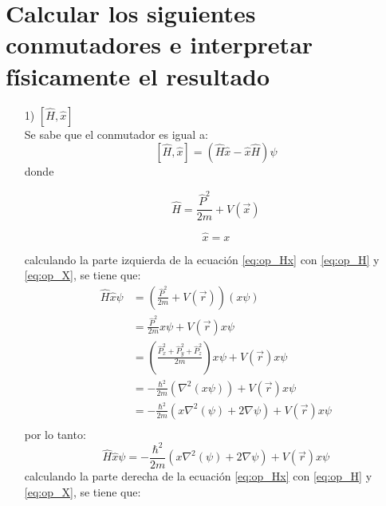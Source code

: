\documentclass[12pt,letterpaper]{article}
\begin{document}
\section*{Calcular los siguientes conmutadores e interpretar físicamente el resultado}
\begin{enumerate}
    \item[1)] $[\hat{H},\hat{x}]$\\
    Se sabe que el conmutador es igual a:
    \begin{equation}
        \label{eq:op_Hx}
        [\hat{H},\hat{x}]=(\hat{H}\hat{x}-\hat{x}\hat{H})\psi
    \end{equation}
    donde \\
    \begin{minipage}{0.5\linewidth}
        \begin{equation}
            \label{eq:op_H}
            \hat{H} = \frac{\hat{P}^2}{2m} +V(\vec{x})
        \end{equation}
    \end{minipage}
    \begin{minipage}{0.5\linewidth}
        \begin{equation}
            \label{eq:op_X}
            \hat{x} = x
        \end{equation}
    \end{minipage}
    calculando la parte izquierda de la ecuación \ref{eq:op_Hx} con \ref{eq:op_H} y \ref{eq:op_X}, se tiene que:
    \begin{align*}
        \hat{H}\hat{x}\psi &= \left(\frac{\hat{P}^2}{2m} +V(\vec{r}) \right) (x\psi)\\ 
        &= \frac{\hat{P}^2 }{2m} x\psi + V(\vec{r})x\psi \\
        &= \left(\frac{\hat{P}^2_x+\hat{P}^2_y+\hat{P}^2_z }{2m}\right) x\psi + V(\vec{r})x\psi \\
        &= -\frac{\hbar^2}{2m} \left(\nabla^2(x\psi)  \right)+ V(\vec{r})x\psi \\
        &= -\frac{\hbar^2}{2m} \left(x\nabla^2(\psi) + 2 \nabla \psi \right)+ V(\vec{r})x\psi \\
    \end{align*}
    por lo tanto:
    \begin{equation}
        \label{eq:Hx_izq}
        \hat{H}\hat{x}\psi =  -\frac{\hbar^2}{2m} \left(x\nabla^2(\psi) + 2 \nabla \psi \right)+ V(\vec{r})x\psi
    \end{equation}
    calculando la parte derecha de la ecuación \ref{eq:op_Hx} con \ref{eq:op_H} y \ref{eq:op_X}, se tiene que:

\end{enumerate}
\end{document}
